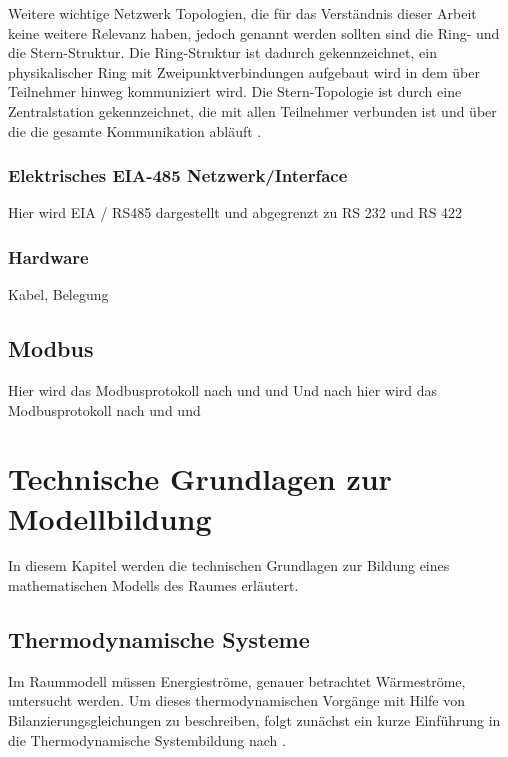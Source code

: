 Weitere wichtige Netzwerk Topologien, die für das Verständnis dieser Arbeit keine weitere Relevanz haben, jedoch genannt werden sollten sind die Ring- und die Stern-Struktur. Die Ring-Struktur ist dadurch gekennzeichnet, ein physikalischer Ring mit Zweipunktverbindungen aufgebaut wird in dem über Teilnehmer hinweg kommuniziert wird. Die Stern-Topologie ist durch eine Zentralstation gekennzeichnet, die mit allen Teilnehmer verbunden ist und über die die gesamte Kommunikation abläuft \cite[S.~6f.]{schn06}.

\subsubsection{Elektrisches EIA-485 Netzwerk/Interface}
Hier wird EIA / RS485 dargestellt und abgegrenzt zu RS 232 und RS 422

\subsubsection{Hardware}
Kabel, Belegung

\subsection{Modbus}
Hier wird das Modbusprotokoll nach \cite{mod12} und \cite{mod06ser} und \cite{mod06tcp}  
Und nach hier wird das Modbusprotokoll nach \cite[S.5]{mod12} und \cite[S.5]{mod06ser} und \cite[S.5]{mod06tcp}









\section{Technische Grundlagen zur Modellbildung}
\label{sec:grundlagenmodell}
In diesem Kapitel werden die technischen Grundlagen zur Bildung eines mathematischen Modells des Raumes erläutert.

\subsection{Thermodynamische Systeme}
Im Raummodell müssen Energieströme, genauer betrachtet Wärmeströme, untersucht werden. Um dieses thermodynamischen Vorgänge mit Hilfe von Bilanzierungsgleichungen zu beschreiben, folgt zunächst ein kurze Einführung in die Thermodynamische Systembildung nach \cite[S.~11ff.]{ba12}.

